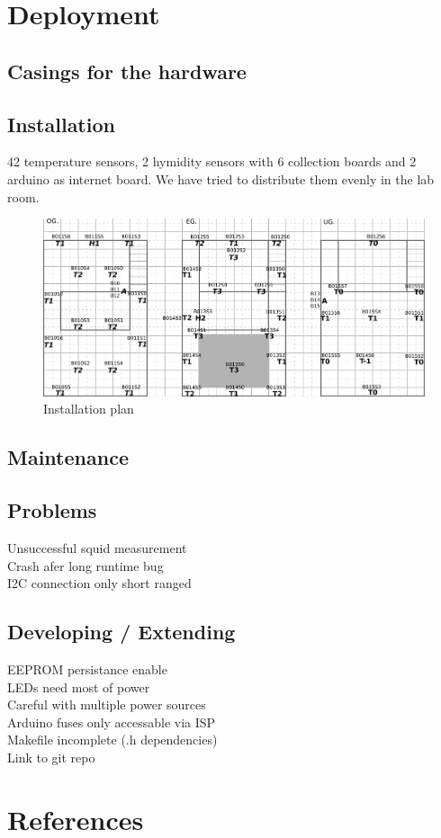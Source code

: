 \documentclass[a4paper]{scrreprt}
\begin{document}
\chapter{Deployment}
\section{Casings for the hardware}
\section{Installation}
42 temperature sensors, 2 hymidity sensors with 6 collection boards and 2 arduino as internet board. We have tried to distribute them evenly in the lab room.
\begin{figure}
	\centering
	\includegraphics[width=\textwidth]{img/installPlan.pdf}
  \caption{Installation plan}
	\label{fig:install}
\end{figure}
\section{Maintenance}
\section{Problems}
Unsuccessful squid measurement\\
Crash afer long runtime bug\\
I2C connection only short ranged
\section{Developing / Extending}
EEPROM persistance enable\\
LEDs need most of power\\
Careful with multiple power sources\\
Arduino fuses only accessable via ISP\\
Makefile incomplete (.h dependencies)\\
Link to git repo
\chapter{References}
%

\begingroup
\def\chapter*#1{}

\endgroup
%
\nocite{*}
\end{document}
